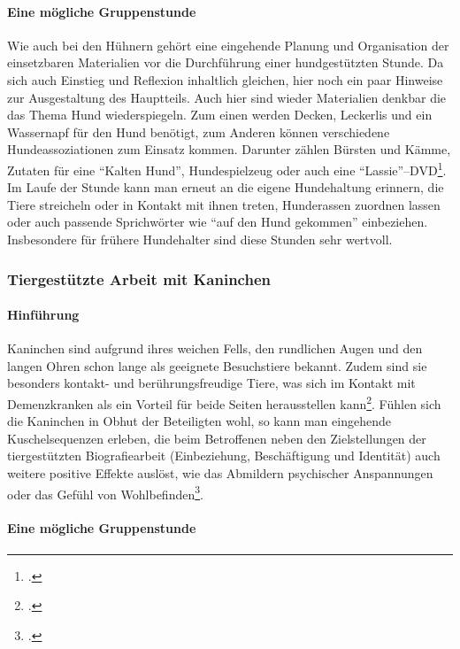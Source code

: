 \paragraph{Eine mögliche Gruppenstunde}
\label{sec:k4.3.2.2_EineMöglicheGruppenstunde}

Wie auch bei den Hühnern gehört eine eingehende Planung und Organisation der einsetzbaren Materialien vor die Durchführung einer hundgestützten Stunde. Da sich auch Einstieg und Reflexion inhaltlich gleichen, hier noch ein paar Hinweise zur Ausgestaltung des Hauptteils. Auch hier sind wieder Materialien denkbar die das Thema Hund wiederspiegeln. Zum einen werden Decken, Leckerlis und ein Wassernapf für den Hund benötigt, zum Anderen können verschiedene Hundeassoziationen zum Einsatz kommen. Darunter zählen Bürsten und Kämme, Zutaten für eine "`Kalten Hund"', Hundespielzeug oder auch eine "`Lassie"'--DVD\footcite[106-111]{Giruc2011}. Im Laufe der Stunde kann man erneut an die eigene Hundehaltung erinnern, die Tiere streicheln oder in Kontakt mit ihnen treten, Hunderassen zuordnen lassen oder auch passende Sprichwörter wie "`auf den Hund gekommen"' einbeziehen. Insbesondere für frühere Hundehalter sind diese Stunden sehr wertvoll.

\subsubsection{Tiergestützte Arbeit mit Kaninchen}
\label{sec:k4.3.3_TiergestützteArbeitMitKaninchen}

\paragraph{Hinführung}
\label{sec:k4.3.3.1_Hinfuehrung}

Kaninchen sind aufgrund ihres weichen Fells, den rundlichen Augen und den langen Ohren schon lange als geeignete Besuchstiere bekannt. Zudem sind sie besonders kontakt- und berührungsfreudige Tiere, was sich im Kontakt mit Demenzkranken als ein Vorteil für beide Seiten herausstellen kann\footcite[40]{Giruc2011}. Fühlen sich die Kaninchen in Obhut der Beteiligten wohl, so kann man eingehende Kuschelsequenzen erleben, die beim Betroffenen neben den Zielstellungen der tiergestützten Biografiearbeit (Einbeziehung, Beschäftigung und Identität) auch weitere positive Effekte auslöst, wie das Abmildern psychischer Anspannungen oder das Gefühl von Wohlbefinden\footcite[74]{Leder2006}.

\paragraph{Eine mögliche Gruppenstunde}
\label{sec:k4.3.3.2_EineMöglicheGruppenstunde}

